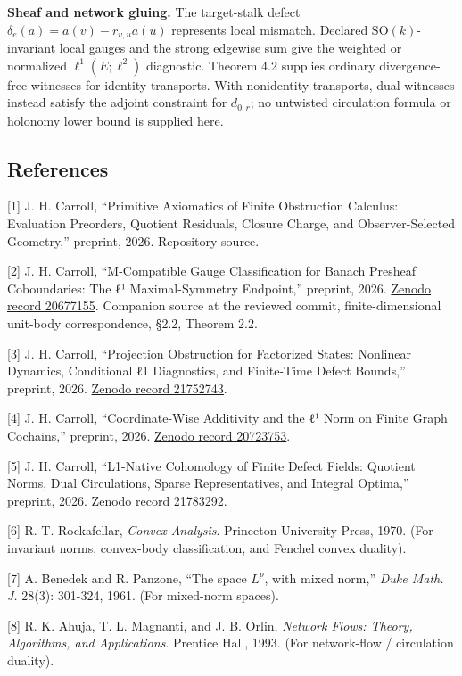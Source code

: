 \documentclass[
  11pt,
]{article}
\begin{document}
\textbf{Sheaf and network gluing.} The target-stalk defect
\(\delta_e(a)=a(v)-r_{v,u}a(u)\) represents local mismatch. Declared
\(\mathrm{SO}(k)\)-invariant local gauges and the strong edgewise sum
give the weighted or normalized \(\ell^1(E;\ell^2)\) diagnostic. Theorem
4.2 supplies ordinary divergence-free witnesses for identity transports.
With nonidentity transports, dual witnesses instead satisfy the adjoint
constraint for \(d_{0,r}\); no untwisted circulation formula or holonomy
lower bound is supplied here.

\newpage

\subsection{References}\label{references}

{[}1{]} J. H. Carroll, ``Primitive Axiomatics of Finite Obstruction
Calculus: Evaluation Preorders, Quotient Residuals, Closure Charge, and
Observer-Selected Geometry,'' preprint, 2026.
Repository
source.

{[}2{]} J. H. Carroll, ``M-Compatible Gauge Classification for Banach
Presheaf Coboundaries: The ℓ¹ Maximal-Symmetry Endpoint,'' preprint,
2026. \href{https://zenodo.org/records/20677155}{Zenodo record
20677155}.
Companion
source at the reviewed commit, finite-dimensional unit-body
correspondence, §2.2, Theorem 2.2.

{[}3{]} J. H. Carroll, ``Projection Obstruction for Factorized States:
Nonlinear Dynamics, Conditional ℓ1 Diagnostics, and Finite-Time Defect
Bounds,'' preprint, 2026.
\href{https://zenodo.org/records/21752743}{Zenodo record 21752743}.

{[}4{]} J. H. Carroll, ``Coordinate-Wise Additivity and the ℓ¹ Norm on
Finite Graph Cochains,'' preprint, 2026.
\href{https://zenodo.org/records/20723753}{Zenodo record 20723753}.

{[}5{]} J. H. Carroll, ``L1-Native Cohomology of Finite Defect Fields:
Quotient Norms, Dual Circulations, Sparse Representatives, and Integral
Optima,'' preprint, 2026.
\href{https://zenodo.org/records/21783292}{Zenodo record 21783292}.

{[}6{]} R. T. Rockafellar, \emph{Convex Analysis}. Princeton University
Press, 1970. (For invariant norms, convex-body classification, and
Fenchel convex duality).

{[}7{]} A. Benedek and R. Panzone, ``The space \(L^p\), with mixed
norm,'' \emph{Duke Math. J.} 28(3): 301-324, 1961. (For mixed-norm
spaces).

{[}8{]} R. K. Ahuja, T. L. Magnanti, and J. B. Orlin, \emph{Network
Flows: Theory, Algorithms, and Applications}. Prentice Hall, 1993. (For
network-flow / circulation duality).
\end{document}

